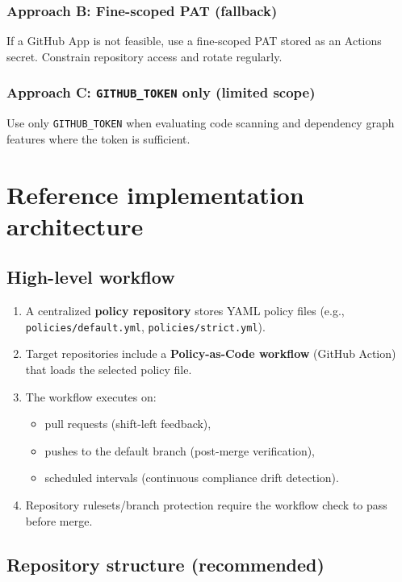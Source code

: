 \documentclass[11pt]{article}
\renewcommand{\cmd}[1]{\texttt{#1}}
\begin{document}
\subsubsection{Approach B: Fine-scoped PAT (fallback)}

If a GitHub App is not feasible, use a fine-scoped PAT stored as an Actions secret. Constrain repository access and rotate regularly.

\subsubsection{Approach C: \cmd{GITHUB\_TOKEN} only (limited scope)}

Use only \cmd{GITHUB\_TOKEN} when evaluating code scanning and dependency graph features where the token is sufficient.

\section{Reference implementation architecture}

\subsection{High-level workflow}

\begin{enumerate}[leftmargin=*]
  \item A centralized \textbf{policy repository} stores YAML policy files (e.g., \cmd{policies/default.yml}, \cmd{policies/strict.yml}).
  \item Target repositories include a \textbf{Policy-as-Code workflow} (GitHub Action) that loads the selected policy file.
  \item The workflow executes on:
  \begin{itemize}
    \item pull requests (shift-left feedback),
    \item pushes to the default branch (post-merge verification),
    \item scheduled intervals (continuous compliance drift detection).
  \end{itemize}
  \item Repository rulesets/branch protection require the workflow check to pass before merge.
\end{enumerate}

\subsection{Repository structure (recommended)}
\end{document}
